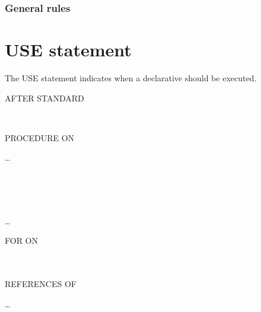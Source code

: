 \subsubsection{General rules}

\section{USE statement}

The USE statement indicates when a declarative should be executed.

\begin{syntax}
  \begin{0-1}
  \end{0-1}
  AFTER STANDARD
  \begin{1=}
     \\
  \end{1=}
  PROCEDURE ON

  \begin{1=}
    \begin{1=}
      \filename
    \end{1=} \ldots
    \begin{0+}
       \\
       \\
       \\
    \end{0+} \ldots
  \end{1=}
\end{syntax}

\begin{syntax}[\deletedcolour]
   FOR  ON
  \begin{1=}
    \procedurename \\
      \\
     REFERENCES OF \identifier
  \end{1=} \ldots
\end{syntax}

\begin{syntax}[\miscextcolour]
\end{syntax}

